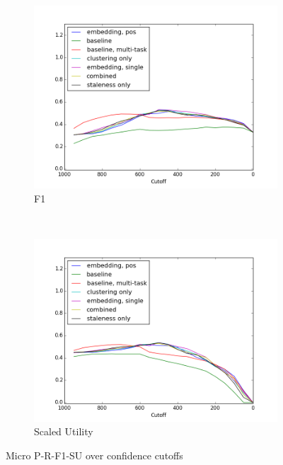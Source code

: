 \documentclass{article}
\begin{document}
\begin{figure}[tb]
    \begin{subfigure}[b]{\officialRunWidth}
            \includegraphics[width=\textwidth,clip=true,trim=15mm 0mm 15mm 5mm]{fig/microF1}
      \caption{F1}
      \label{official:microf1}
    \end{subfigure}
    ~
    \begin{subfigure}[b]{\officialRunWidth}
            \includegraphics[width=\textwidth,clip=true,trim=15mm 0mm 15mm 5mm]{fig/microSU}
      \caption{Scaled Utility}
      \label{official:microsu}
    \end{subfigure}
\caption{Micro P-R-F1-SU over confidence cutoffs}
\label{microRuns}
\end{figure}
\end{document}
